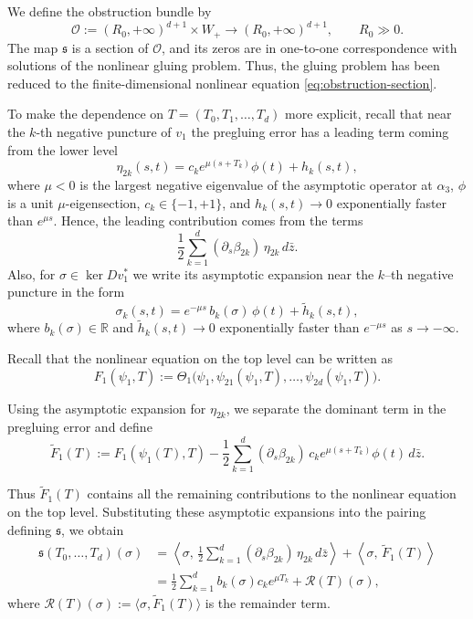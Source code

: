 \documentclass{amsart}
\newcommand{\R}{\mathbb{R}}
\begin{document}
We define the obstruction bundle by
$$
\mathcal O := (R_0,+\infty)^{d+1}\times W_+ \longrightarrow (R_0,+\infty)^{d+1}, \qquad R_0 \gg 0.
$$
The map $\mathfrak{s}$ is a section of $\mathcal O$, and its zeros are in one-to-one
correspondence with solutions of the nonlinear gluing problem. Thus, the gluing problem has been reduced to the finite-dimensional nonlinear
equation \eqref{eq:obstruction-section}.

To make the dependence on $T=(T_0,T_1,\ldots,T_d)$ more explicit, recall that near the $k$-th negative puncture of $v_1$ the pregluing error has a leading term coming from the lower level
$$
\eta_{2k}(s,t)=c_k e^{\mu (s+T_k)}\phi(t)+h_k(s,t),
$$
where $\mu<0$ is the largest negative eigenvalue of the asymptotic operator
at $\alpha_3$, $\phi$ is a unit $\mu$-eigensection, $c_k\in \{-1,+1\}$, and
$h_k(s,t)\to 0$ exponentially faster than $e^{\mu s}$.  Hence, the leading contribution comes from the terms
$$
\frac12 \sum_{k=1}^d (\partial_s\beta_{2k})\,\eta_{2k}\,d\bar z .
$$
Also, for $\sigma\in \ker Dv_1^*$ we write its asymptotic expansion near
the $k$--th negative puncture in the form
$$
\sigma_k(s,t)=e^{-\mu s}\,b_k(\sigma)\,\phi(t)+\widetilde h_k(s,t),
$$
where $b_k(\sigma)\in \R$ and $\widetilde h_k(s,t)\to 0$ exponentially faster than $e^{-\mu s}$ as $s\to -\infty$.

Recall that the nonlinear equation on the top level can be written as
$$
F_1(\psi_1,T)
:=
\Theta_1\bigl(\psi_1,\psi_{21}(\psi_1,T),\dots,\psi_{2d}(\psi_1,T)\bigr).
$$

Using the asymptotic expansion
for $\eta_{2k}$, we separate the dominant term in the pregluing error and define
$$
\widetilde F_1(T)
:=
F_1(\psi_1(T),T)
-
\frac12
\sum_{k=1}^d
(\partial_s\beta_{2k})
\,c_k e^{\mu (s+T_k)}
\phi(t)\, d\bar z.
$$

Thus $\widetilde F_1(T)$ contains all the remaining contributions to the
nonlinear equation on the top level. Substituting these asymptotic expansions into the pairing defining
$\mathfrak{s}$, we obtain
\begin{align*}
\mathfrak{s}(T_0,\dots,T_d)(\sigma)
&=
\left\langle \sigma,\,
\frac12 \sum_{k=1}^d (\partial_s\beta_{2k})\,\eta_{2k}\,d\bar z
\right\rangle
+
\left\langle \sigma,\,
\widetilde F_1(T)
\right\rangle \\
&=
\frac12 \sum_{k=1}^d b_k(\sigma)c_k e^{\mu T_k}
+
\mathcal{R}(T)(\sigma),
\end{align*}
where $\mathcal R(T)(\sigma) := \langle \sigma, \widetilde F_1(T) \rangle$ is the remainder term.
\end{document}
